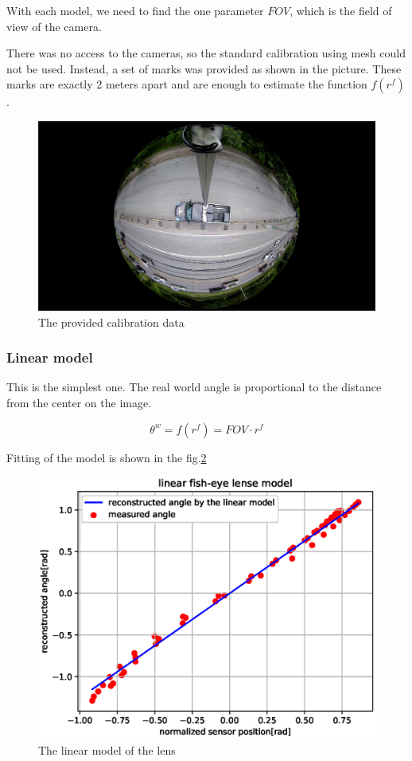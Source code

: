 \documentclass[a4paper,12pt,titlepage, twoside]{article}
\numberwithin{figure}{section}
\begin{document}
With each model, we need to find the one parameter $FOV$, which is the field of view of the camera.

There was no access to the cameras, so the standard calibration using mesh could not be used. Instead, a set of marks was provided as shown in the picture. These marks are exactly 2 meters apart and are enough to estimate the function $f(r^f)$.

\begin{figure}[h!]
\centering
\includegraphics[width=1\linewidth]{fig/calibration.png}
\caption{The provided calibration data}
\label{fig:calibration}
\end{figure}


\subsubsection{Linear model}

This is the simplest one. The real world angle is proportional to the distance from the center on the image. 

\begin{equation}
\theta^w = f(r^f) = FOV \cdot r^f
\end{equation}

Fitting of the model is shown in the fig.\ref{fig:linear_model}

\begin{figure}[h!]
\centering
\includegraphics[width=1\linewidth]{fig/linear_model3.eps}
\caption{The linear model of the lens}
\label{fig:linear_model}
\end{figure}
\end{document}
